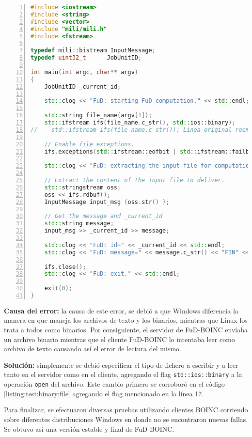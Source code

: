 \begin{lstlisting}[frame=shadowbox, language=C++, numbers=left, xleftmargin=8mm, framexleftmargin=22pt, basicstyle=\scriptsize, numberstyle=\footnotesize, breaklines=true, breakatwhitespace=false, caption={Test de lectura realizada por un cliente FuD-BOINC}, label=listing:test:binary:file, backgroundcolor=\color{gris}, keywordstyle=\color{Blue}]
#include <iostream>
#include <string>
#include <vector>
#include "mili/mili.h"
#include <fstream>

typedef mili::bistream InputMessage;
typedef uint32_t      JobUnitID;

int main(int argc, char** argv)
{
    JobUnitID _current_id;

    std::clog << "FuD: starting FuD computation." << std::endl;
       
    std::string file_name(argv[1]);
    std::ifstream ifs(file_name.c_str(), std::ios::binary);
//    std::ifstream ifs(file_name.c_str()); Linea original reemplazada por el anterior

    // Enable file exceptions.
    ifs.exceptions(std::ifstream::eofbit | std::ifstream::failbit | std::ifstream::badbit);

    std::clog << "FuD: extracting the input file for computation." << std::endl;
        
    // Extract the content of the input file to deliver.
    std::stringstream oss;
    oss << ifs.rdbuf();
    InputMessage input_msg (oss.str() );

    // Get the message and _current_id
    std::string message;
    input_msg >> _current_id >> message;
    
    std::clog << "FuD: id=" << _current_id << std::endl;
    std::clog << "FuD: message=" << message.c_str() << "FIN" << std::endl;

    ifs.close();
    std::clog << "FuD: exit." << std::endl;

    exit(0);
}
\end{lstlisting}

\hspace{2mm}

\textbf{Causa del error:} la causa de este error, se debió a que Windows diferencia la manera en que maneja los archivos de texto y los binarios, mientras que Linux los trata a todos como binarios. Por consiguiente, el servidor de FuD-BOINC envíaba un archivo binario mientras que el cliente FuD-BOINC lo intentaba leer como archivo de texto causando así el error de lectura del mismo. 

\textbf{Solución:} simplemente se debió especificar el tipo de fichero a escribir y a leer tanto en el servidor como en el cliente, agregando el flag \texttt{std::ios::binary} a la operación \texttt{open} del archivo. Este cambio primero se corroboró en el código \ref{listing:test:binary:file} agregando el flag mencionado en la línea 17.

Para finalizar, se efectuaron diversas pruebas utilizando clientes BOINC corriendo sobre diferentes distribuciones Windows en donde no se encontraron nuevas fallas. Se obtuvo así una versión estable y final de FuD-BOINC.


